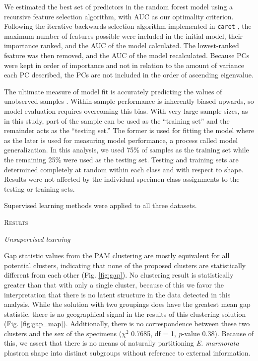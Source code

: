 \documentclass[12pt,letterpaper]{article}
\renewcommand{\section}[1]{%
\bigskip
\begin{center}
\begin{Large}
\normalfont\scshape #1
\medskip
\end{Large}
\end{center}}
\renewcommand{\subsection}[1]{%
\bigskip
\begin{center}
\begin{large}
\normalfont\itshape #1
\end{large}
\end{center}}
\begin{document}
We estimated the best set of predictors in the random forest model using a recursive feature selection algorithm, with AUC as our optimality criterion. Following the iterative backwards selection algorithm implemented in \texttt{caret} \citep{KuhnMAN2013}, the maximum number of features possible were included in the initial model, their importance ranked, and the AUC of the model calculated. The lowest-ranked feature was then removed, and the AUC of the model recalculated. Because PCs were kept in order of importance and not in relation to the amount of variance each PC described, the PCs are not included in the order of ascending eigenvalue.

The ultimate measure of model fit is accurately predicting the values of unobserved samples \citep{Hastie2009,Kuhn2013}. Within-sample performance is inherently biased upwards, so model evaluation requires overcoming this bias. With very large sample sizes, as in this study, part of the sample can be used as the ``training set'' and the remainder acts as the ``testing set.'' The former is used for fitting the model where as the later is used for measuring model performance, a process called model generalization. In this analysis, we used 75\% of samples as the training set while the remaining 25\% were used as the testing set. Testing and training sets are determined completely at random within each class and with respect to shape. Results were not affected by the individual specimen class assignments to the testing or training sets.

Supervised learning methods were applied to all three datasets.


\section{Results}

\subsection{Unsupervised learning}

Gap statistic values from the PAM clustering are mostly equivalent for all potential clusters, indicating that none of the proposed clusters are statistically different from each other (Fig. \ref{fig:gap}). No clustering result is statistically greater than that with only a single cluster, because of this we favor the interpretation that there is no latent structure in the data detected in this analysis. While the solution with two groupings does have the greatest mean gap statistic, there is no geographical signal in the results of this clustering solution (Fig. \ref{fig:gap_map}). Additionally, there is no correspondence between these two clusters and the sex of the specimens (\(\chi^{2}\) 0.7685, df = 1, \textit{p}-value 0.38). Because of this, we assert that there is no means of naturally partitioning \textit{E. marmorata} plastron shape into distinct subgroups without reference to external information. 
\end{document}
